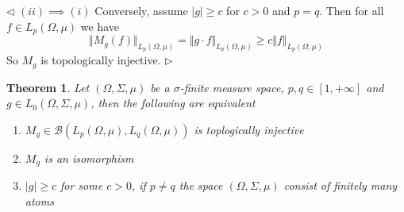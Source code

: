 \documentclass[12pt]{article}
\newtheorem{theorem}{Theorem}[subsection]
\newenvironment{proof}{\par $\triangleleft$}{$\triangleright$}
\begin{document}
\begin{proof}
    $(ii)\implies (i)$ Conversely, assume $|g|\geq c$ for $c>0$ and $p=q$.
    Then for all $f\in L_p(\Omega,\mu)$ we have
    $$
        \Vert M_g(f)\Vert_{L_p(\Omega,\mu)} =\Vert g\cdot
        f\Vert_{L_p(\Omega,\mu)} \geq c\Vert f\Vert_{L_p(\Omega,\mu)}
    $$
    So $M_g$ is topologically injective.
\end{proof}

\begin{theorem}\label{TopInjMultOpCharacOnMeasSp} Let $(\Omega,\Sigma,\mu)$ be
    a $\sigma$-finite measure space, $p,q\in[1,+\infty]$ and
    $g\in L_0(\Omega,\Sigma,\mu)$, then the following are equivalent
    \begin{enumerate}[label = (\roman*)]
        \item $M_g\in\mathcal{B}(L_p(\Omega,\mu),L_q(\Omega,\mu))$ is
              toplogically injective

        \item $M_g$ is an isomorphism

        \item $|g|\geq c$ for some $c>0$, if $p\neq q$ the space
              $(\Omega,\Sigma,\mu)$ consist of finitely many atoms
    \end{enumerate}
\end{theorem}
\end{document}
